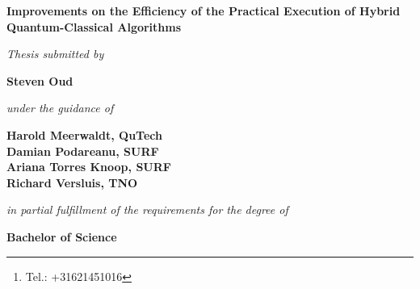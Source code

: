 \documentclass[a4paper,11pt]{report}
\title{\thesistitle}
\author{\authorname\thanks{Tel.: +31621451016}\\
    500776959\\
    \\
    \emph{Faculty of Computer Science, Information Technology,}\\
    \emph{Business IT and Management}\\
    Software Engineering
    \\
    \\
    \\
    Advisor: Marten Teitsma
    \\
    \\
    \\
    Amsterdam University of Applied Sciences\\
    \today}
\date{}
\renewcommand{\thefootnote}{\fnsymbol{footnote}}
\newcommand{\thesistitle}{Improvements on the Efficiency of the Practical Execution of Hybrid Quantum-Classical Algorithms}
\newcommand{\authorname}{Steven Oud}
\begin{document}
\begin{titlepage}
\thispagestyle{empty}
    \begin{center}
        \vspace*{1cm}
        \textbf{\LARGE \thesistitle}
        
        \vspace{1.5cm}
        \textit{\large Thesis submitted by}

        \vspace{0.75cm}
        
        \textbf{\large \authorname}
        
        \vspace{0.75cm}
        \textit{\large under the guidance of}
        
        \vspace{0.75cm}
        \textbf{\large Harold Meerwaldt, QuTech\\
            Damian Podareanu, SURF\\
            Ariana Torres Knoop, SURF\\
            Richard Versluis, TNO}
        
        \vspace{0.75cm}
        \textit{\large in partial fulfillment of the requirements for the degree of}
        
        \vspace{0.75cm}
        \textbf{\large Bachelor of Science}
        
    \end{center}
\end{titlepage}

\maketitle

\renewcommand{\thefootnote}{\arabic{footnote}}
\end{document}
